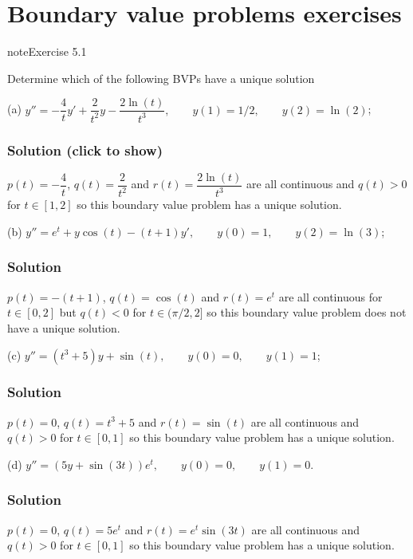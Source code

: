 \documentclass[letterpaper,10pt,english]{jupyterBook}
\begin{document}
\section{Boundary value problems exercises}
\label{\detokenize{5_BVPs/5.4_BVP_exercises:boundary-value-problems-exercises}}\label{\detokenize{5_BVPs/5.4_BVP_exercises::doc}}
\begin{sphinxadmonition}{note}{Exercise 5.1}

\sphinxAtStartPar
Determine which of the following BVPs have a unique solution

\sphinxAtStartPar
(a)  \(y'' = - \dfrac{4}{t} y' + \dfrac{2}{t^2 } y - \dfrac{2\ln (t)}{t^3 }, \qquad y(1) = 1/2, \qquad y(2) = \ln (2)\);
\subsubsection*{Solution (click to show)}

\sphinxAtStartPar
\(p(t) = -\dfrac{4}{t}\), \(q(t) = \dfrac{2}{t^2}\) and \(r(t) = \dfrac{2\ln(t)}{t^3}\) are all continuous and \(q(t) > 0\) for \(t \in [1, 2]\) so this boundary value problem has a unique solution.

\sphinxAtStartPar
(b)  \(y'' = e^t + y\cos(t) - (t + 1) y', \qquad y(0) = 1, \qquad y(2) = \ln(3)\);
\subsubsection*{Solution}

\sphinxAtStartPar
\(p(t) = -(t + 1)\), \(q(t) = \cos(t)\) and \(r(t) = e^t\) are all continuous for \(t\in[0,2]\) but \(q(t) < 0\) for \(t \in (\pi/2, 2]\) so this boundary value problem does not have a unique solution.

\sphinxAtStartPar
(c)  \(y'' = (t^3 + 5)y + \sin(t), \qquad y(0) = 0,\qquad y(1) = 1\);
\subsubsection*{Solution}

\sphinxAtStartPar
\(p(t) = 0\), \(q(t) = t^3 + 5\) and \(r(t) = \sin(t)\) are all continuous and \(q(t) > 0\) for \(t\in[0,1]\) so this boundary value problem has a unique solution.

\sphinxAtStartPar
(d)  \(y'' = (5y + \sin(3t)) e^t, \qquad y(0) = 0,\qquad y(1) = 0\).
\subsubsection*{Solution}

\sphinxAtStartPar
\(p(t) = 0\), \(q(t) = 5e^t\) and \(r(t) = e^t\sin(3t)\) are all continuous and \(q(t) > 0\) for \(t\in[0,1]\) so this boundary value problem has a unique solution.
\end{sphinxadmonition}
\end{document}
